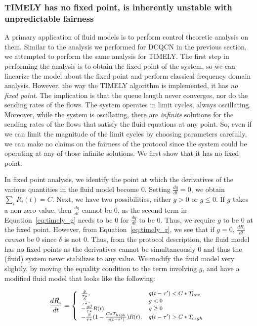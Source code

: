 \subsubsection{TIMELY has no fixed point, is inherently unstable with
unpredictable fairness} 
A primary application of fluid models is to perform control theoretic analysis
on them. Similar to the analysis we performed for DCQCN in the previous section,
we attempted to perform the same analysis for TIMELY. The first step in
performing the analysis is to obtain the fixed point of the system, so we can
linearize the model about the fixed point and perform classical frequency domain
analysis. However, the way the TIMELY algorithm is implemented, it has \emph{no
fixed point}. The implication is that the queue length never converges, nor do
the sending rates of the flows. The system operates in limit cycles, always
oscillating. Moreover, while the system is oscillating, there are
\emph{infinite} solutions for the sending rates of the flows that satisfy the
fluid equations at any point. So, even if we can limit the magnitude of the
limit cycles by choosing parameters carefully, we can make no claims on the
fairness of the protocol since the system could be operating at any of those
infinite solutions. We first show that it has no fixed point.

In fixed point analysis, we identify the point at which the derivatives of the
various quantities in the fluid model become 0.  Setting $\tfrac{dq}{dt} = 0$,
we obtain $\sum_{i} R_i(t) = C$. Next, we have two possibilities, either $g > 0$
or $g  \le 0$. If $g$ takes a non-zero value, then $\tfrac{dg}{dt}$ cannot be 0,
as the second term in Equation~\ref{eq:timely_g} needs to be 0 for
$\tfrac{dq}{dt}$ to be 0. Thus, we require $g$ to be 0 at the fixed point.
However, from Equation~\ref{eq:timely_r}, we see that if $g = 0$,
$\tfrac{dR_i}{dt}$ \emph{cannot} be 0 since $\delta$ is not 0. Thus, from the
protocol description, the fluid model has no fixed points as the derivatives
cannot be simultaneously 0 and thus the (fluid) system never stabilizes to any
value. We modify the fluid model very slightly, by moving the equality condition
to the term involving $g$, and have a modified fluid model that looks like the
following:

\begin{equation}
\small
\frac{{dR_i}}{{dt}} = \left\{ \begin{array}{ll}
\frac{\delta }{{\tau *}}, & q(t - \tau ') < C*{T_{low}}\\
\frac{\delta }{{\tau *}}, & g < 0\\
 - \frac{{g\beta }}{{\tau *}}R(t), & g \ge 0\\
 - \frac{\beta }{{\tau *}}(1 - \frac{{C*{T_{high}}}}{{q(t - \tau ')}})R(t), & q(t - \tau ') > C*{T_{high}}
\end{array} \right.\\
\label{eq:timely_r_modified}
\end{equation}


